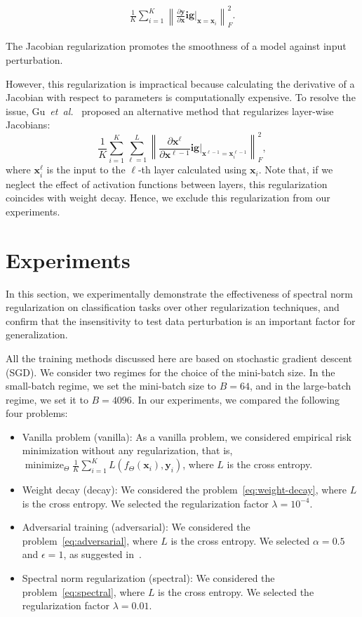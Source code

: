 \begin{align*}
  \frac{1}{K}\sum_{i=1}^K \left\|\frac{\partial {\bm y}}{\partial {\bm x}}\mathbf{ig}|_{{\bm x}={\bm x}_i}\right\|_F^2.
\end{align*}

The Jacobian regularization promotes the smoothness of a model against input perturbation.

However, this regularization is impractical because calculating the derivative of a Jacobian with respect to parameters is computationally expensive. To resolve the issue, Gu~\emph{et~al.}~\cite{gu2014towards} proposed an alternative method that regularizes layer-wise Jacobians:
\[
  \frac{1}{K}\sum_{i=1}^K \sum_{\ell=1}^{L} \left\|\frac{\partial {\bm x}^{\ell}}{\partial {\bm x}^{\ell-1}}\mathbf{ig}|_{{\bm x}^{\ell-1}={\bm x}^{\ell-1}_i}\right\|_F^2,
\]
where ${\bm x}^\ell_i$ is the input to the $\ell$-th layer calculated using ${\bm x}_i$. Note that, if we neglect the effect of activation functions between layers, this regularization coincides with weight decay. Hence, we exclude this regularization from our experiments.

\section{Experiments}\label{sec:experiments}

In this section, we experimentally demonstrate the effectiveness of spectral norm regularization on classification tasks over other regularization techniques, and confirm that the insensitivity to test data perturbation is an important factor for generalization.

All the training methods discussed here are based on stochastic gradient descent (SGD). We consider two regimes for the choice of the mini-batch size. In the small-batch regime, we set the mini-batch size to $B=64$, and in the large-batch regime, we set it to $B=4096$. In our experiments, we compared the following four problems:

\begin{itemize}
\itemsep=0pt
\item Vanilla problem (\textsf{vanilla}):
  As a vanilla problem, we considered empirical risk minimization without any regularization, that is, $\mathop{\text{minimize}}_{\Theta} \frac{1}{K}\sum_{i=1}^K L(f_\Theta({\bm x}_i),{\bm y}_i)$, where $L$ is the cross entropy.
\item Weight decay (\textsf{decay}): We considered the problem~\eqref{eq:weight-decay}, where $L$ is the cross entropy. We selected the regularization factor $\lambda=10^{-4}$.
\item Adversarial training (\textsf{adversarial}): We considered the problem~\eqref{eq:adversarial}, where $L$ is the cross entropy. We selected $\alpha=0.5$  and $\epsilon=1$, as suggested in~\cite{Goodfellow:2015tl}.
\item Spectral norm regularization (\textsf{spectral}): We considered the problem~\eqref{eq:spectral}, where $L$ is the cross entropy. We selected the regularization factor $\lambda =0.01$.
\end{itemize}

